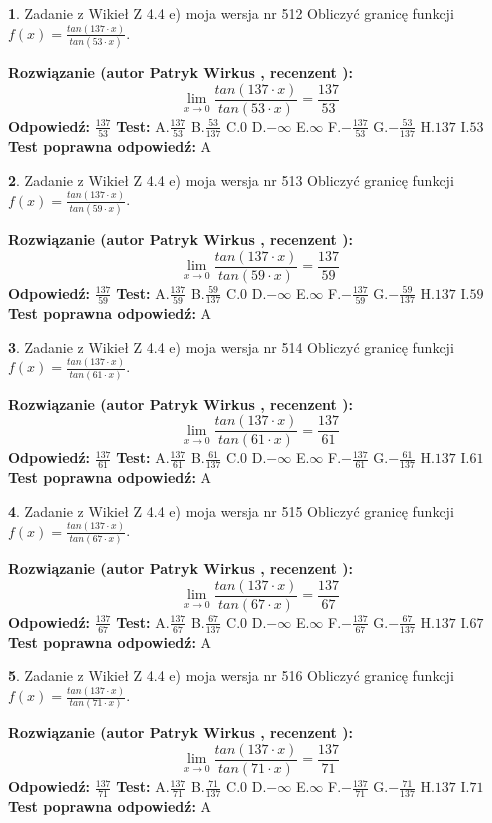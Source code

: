 \documentclass[12pt, a4paper]{article}
\theoremstyle{definition} %
\newtheorem{zad}{}
\newcommand{\zadStart}[1]{\begin{zad}#1\newline}
\newcommand{\zadStop}{\end{zad}}
\newcommand{\rozwStart}[2]{\noindent \textbf{Rozwiązanie (autor #1 , recenzent #2): }\newline}
\newcommand{\rozwStop}{\newline}
\newcommand{\odpStart}{\noindent \textbf{Odpowiedź:}\newline}
\newcommand{\odpStop}{\newline}
\newcommand{\testStart}{\noindent \textbf{Test:}\newline}
\newcommand{\testStop}{\newline}
\newcommand{\kluczStart}{\noindent \textbf{Test poprawna odpowiedź:}\newline}
\newcommand{\kluczStop}{\newline}
\begin{document}
\zadStart{Zadanie z Wikieł Z 4.4 e) moja wersja nr 512}
Obliczyć granicę funkcji $f(x)=\frac{tan(137\cdot x)}{tan(53\cdot x)}$.
\zadStop
\rozwStart{Patryk Wirkus}{}
$$\lim\limits_{x\to 0}\frac{tan(137\cdot x)}{tan(53\cdot x)}=
\frac{137}{53}$$
\rozwStop
\odpStart
$\frac{137}{53}$
\odpStop
\testStart
A.$\frac{137}{53}$
B.$\frac{53}{137}$
C.$0$
D.$-\infty$
E.$\infty$
F.$-\frac{137}{53}$
G.$-\frac{53}{137}$
H.$137$
I.$53$
\testStop
\kluczStart
A
\kluczStop



\zadStart{Zadanie z Wikieł Z 4.4 e) moja wersja nr 513}
Obliczyć granicę funkcji $f(x)=\frac{tan(137\cdot x)}{tan(59\cdot x)}$.
\zadStop
\rozwStart{Patryk Wirkus}{}
$$\lim\limits_{x\to 0}\frac{tan(137\cdot x)}{tan(59\cdot x)}=
\frac{137}{59}$$
\rozwStop
\odpStart
$\frac{137}{59}$
\odpStop
\testStart
A.$\frac{137}{59}$
B.$\frac{59}{137}$
C.$0$
D.$-\infty$
E.$\infty$
F.$-\frac{137}{59}$
G.$-\frac{59}{137}$
H.$137$
I.$59$
\testStop
\kluczStart
A
\kluczStop



\zadStart{Zadanie z Wikieł Z 4.4 e) moja wersja nr 514}
Obliczyć granicę funkcji $f(x)=\frac{tan(137\cdot x)}{tan(61\cdot x)}$.
\zadStop
\rozwStart{Patryk Wirkus}{}
$$\lim\limits_{x\to 0}\frac{tan(137\cdot x)}{tan(61\cdot x)}=
\frac{137}{61}$$
\rozwStop
\odpStart
$\frac{137}{61}$
\odpStop
\testStart
A.$\frac{137}{61}$
B.$\frac{61}{137}$
C.$0$
D.$-\infty$
E.$\infty$
F.$-\frac{137}{61}$
G.$-\frac{61}{137}$
H.$137$
I.$61$
\testStop
\kluczStart
A
\kluczStop



\zadStart{Zadanie z Wikieł Z 4.4 e) moja wersja nr 515}
Obliczyć granicę funkcji $f(x)=\frac{tan(137\cdot x)}{tan(67\cdot x)}$.
\zadStop
\rozwStart{Patryk Wirkus}{}
$$\lim\limits_{x\to 0}\frac{tan(137\cdot x)}{tan(67\cdot x)}=
\frac{137}{67}$$
\rozwStop
\odpStart
$\frac{137}{67}$
\odpStop
\testStart
A.$\frac{137}{67}$
B.$\frac{67}{137}$
C.$0$
D.$-\infty$
E.$\infty$
F.$-\frac{137}{67}$
G.$-\frac{67}{137}$
H.$137$
I.$67$
\testStop
\kluczStart
A
\kluczStop



\zadStart{Zadanie z Wikieł Z 4.4 e) moja wersja nr 516}
Obliczyć granicę funkcji $f(x)=\frac{tan(137\cdot x)}{tan(71\cdot x)}$.
\zadStop
\rozwStart{Patryk Wirkus}{}
$$\lim\limits_{x\to 0}\frac{tan(137\cdot x)}{tan(71\cdot x)}=
\frac{137}{71}$$
\rozwStop
\odpStart
$\frac{137}{71}$
\odpStop
\testStart
A.$\frac{137}{71}$
B.$\frac{71}{137}$
C.$0$
D.$-\infty$
E.$\infty$
F.$-\frac{137}{71}$
G.$-\frac{71}{137}$
H.$137$
I.$71$
\testStop
\kluczStart
A
\kluczStop
\end{document}

